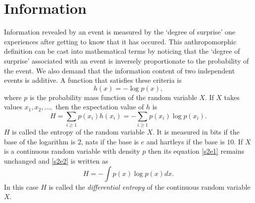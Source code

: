 \documentclass{article}
\numberwithin{equation}{section}
\theoremstyle{plain}
\numberwithin{thm}{section}
\theoremstyle{plain}
\numberwithin{prop}{section}
\theoremstyle{definition}
\numberwithin{defn}{section}
\theoremstyle{remark}
\begin{document}
\section{Information}\label{s2}
Information revealed by an event is measured by the `degree of surprise' one
experiences after getting to know that it has occured. This anthropomorphic
definition can be cast into mathematical terms by noticing that the `degree of
surprise' associated with an event is inversely proportionate to the 
probability of the event. We also demand that the information content of two 
independent events is additive. A function that satisfies these criteria is
\cite[Lemma in section 1]{renyi1961measures}
\begin{equation}\label{s2e1}
h(x) = -\log p(x),
\end{equation}
where $p$ is the probability mass function of the random variable $X$. If $X$
takes values $x_1, x_2, \ldots,$ then the expectation value of $h$ is
\begin{equation}\label{s2e2}
H = \sum_{i \ge 1}p(x_i)h(x_i) = -\sum_{i \ge 1}p(x_i)\log p(x_i).
\end{equation}
$H$ is called the entropy \cite[section 6 and appendix II]{shannon1948} of the 
random variable $X$. It is measured in bits if
the base of the logarithm is $2$, nats if the base is $e$ and hartleys if the
base is $10$. If $X$ is a continuous random variable with density $p$ then
its equation \eqref{s2e1} remains unchanged and \eqref{s2e2} is written as
\begin{equation}\label{s2e3}
H = -\int p(x)\log p(x)dx.
\end{equation}
In this case $H$ is called the \emph{differential entropy} of the continuous 
random variable $X$.
\end{document}

